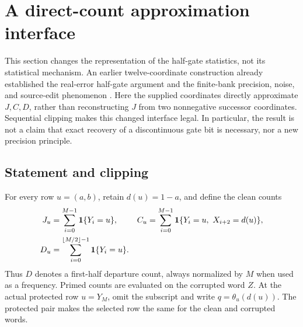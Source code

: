 \section{A direct-count approximation interface}
\label{sec:approximate-proofs}

This section changes the representation of the half-gate statistics, not
its statistical mechanism.  An earlier twelve-coordinate construction
already established the real-error half-gate argument and the finite-bank
precision, noise, and source-edit phenomenon \citep{BCJ001}.  Here the supplied
coordinates directly approximate $J,C,D$, rather than reconstructing $J$
from two nonnegative successor coordinates.  Sequential clipping makes
this changed interface legal.  In particular, the result is not a claim
that exact recovery of a discontinuous gate bit is necessary, nor a new
precision principle.

\subsection{Statement and clipping}

For every row $u=(a,b)$, retain $d(u)=1-a$, and define the clean counts
\begin{align}
 J_u&=\sum_{i=0}^{M-1}\mathbf 1\{Y_i=u\},&
 C_u&=\sum_{i=0}^{M-1}\mathbf 1\{Y_i=u,\ X_{i+2}=d(u)\},
 \label{eq:a-full-counts}\\
 D_u&=\sum_{i=0}^{\lfloor M/2\rfloor-1}\mathbf 1\{Y_i=u\}.
 \label{eq:a-half-count}
\end{align}
Thus $D$ denotes a first-half departure count, always normalized by $M$
when used as a frequency.  Primed counts are evaluated on the corrupted
word $Z$.  At the actual protected row $u=Y_M$, omit the subscript and
write $q=\theta_u(d(u))$.  The protected pair makes the selected row the
same for the clean and corrupted words.

